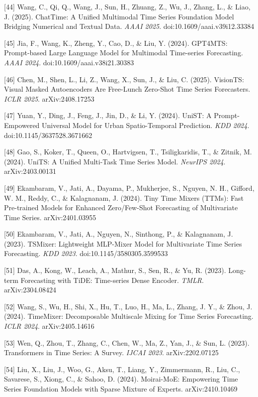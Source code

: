 {[}44{]} Wang, C., Qi, Q., Wang, J., Sun, H., Zhuang, Z., Wu, J., Zhang, L., \& Liao, J. (2025). ChatTime: A Unified Multimodal Time Series Foundation Model Bridging Numerical and Textual Data. \emph{AAAI 2025}. doi:10.1609/aaai.v39i12.33384

{[}45{]} Jia, F., Wang, K., Zheng, Y., Cao, D., \& Liu, Y. (2024). GPT4MTS: Prompt-based Large Language Model for Multimodal Time-series Forecasting. \emph{AAAI 2024}. doi:10.1609/aaai.v38i21.30383

{[}46{]} Chen, M., Shen, L., Li, Z., Wang, X., Sun, J., \& Liu, C. (2025). VisionTS: Visual Masked Autoencoders Are Free-Lunch Zero-Shot Time Series Forecasters. \emph{ICLR 2025}. arXiv:2408.17253

{[}47{]} Yuan, Y., Ding, J., Feng, J., Jin, D., \& Li, Y. (2024). UniST: A Prompt-Empowered Universal Model for Urban Spatio-Temporal Prediction. \emph{KDD 2024}. doi:10.1145/3637528.3671662

{[}48{]} Gao, S., Koker, T., Queen, O., Hartvigsen, T., Tsiligkaridis, T., \& Zitnik, M. (2024). UniTS: A Unified Multi-Task Time Series Model. \emph{NeurIPS 2024}. arXiv:2403.00131

{[}49{]} Ekambaram, V., Jati, A., Dayama, P., Mukherjee, S., Nguyen, N. H., Gifford, W. M., Reddy, C., \& Kalagnanam, J. (2024). Tiny Time Mixers (TTMs): Fast Pre-trained Models for Enhanced Zero/Few-Shot Forecasting of Multivariate Time Series. arXiv:2401.03955

{[}50{]} Ekambaram, V., Jati, A., Nguyen, N., Sinthong, P., \& Kalagnanam, J. (2023). TSMixer: Lightweight MLP-Mixer Model for Multivariate Time Series Forecasting. \emph{KDD 2023}. doi:10.1145/3580305.3599533

{[}51{]} Das, A., Kong, W., Leach, A., Mathur, S., Sen, R., \& Yu, R. (2023). Long-term Forecasting with TiDE: Time-series Dense Encoder. \emph{TMLR}. arXiv:2304.08424

{[}52{]} Wang, S., Wu, H., Shi, X., Hu, T., Luo, H., Ma, L., Zhang, J. Y., \& Zhou, J. (2024). TimeMixer: Decomposable Multiscale Mixing for Time Series Forecasting. \emph{ICLR 2024}. arXiv:2405.14616

{[}53{]} Wen, Q., Zhou, T., Zhang, C., Chen, W., Ma, Z., Yan, J., \& Sun, L. (2023). Transformers in Time Series: A Survey. \emph{IJCAI 2023}. arXiv:2202.07125

{[}54{]} Liu, X., Liu, J., Woo, G., Aksu, T., Liang, Y., Zimmermann, R., Liu, C., Savarese, S., Xiong, C., \& Sahoo, D. (2024). Moirai-MoE: Empowering Time Series Foundation Models with Sparse Mixture of Experts. arXiv:2410.10469

